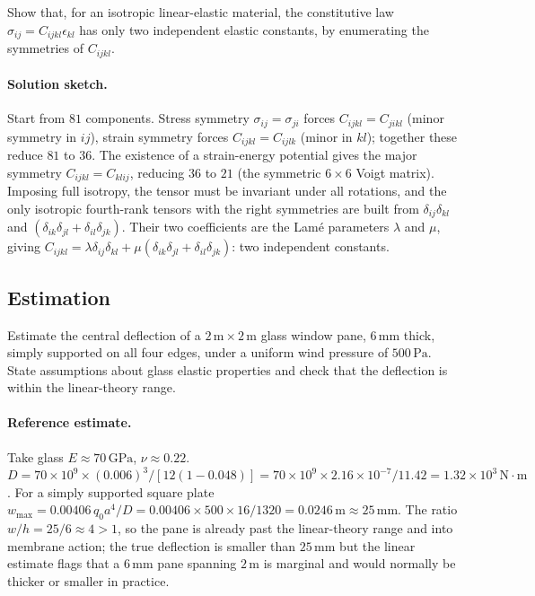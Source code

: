 \begin{exercise}
Show that, for an isotropic linear-elastic material, the
constitutive law $\sigma_{ij} = C_{ijkl} \epsilon_{kl}$ has only
two independent elastic constants, by enumerating the symmetries
of $C_{ijkl}$.

\paragraph{Solution sketch.} Start from $81$ components. Stress
symmetry $\sigma_{ij}=\sigma_{ji}$ forces $C_{ijkl}=C_{jikl}$ (minor
symmetry in $ij$), strain symmetry forces $C_{ijkl}=C_{ijlk}$ (minor
in $kl$); together these reduce $81$ to $36$. The existence of a
strain-energy potential gives the major symmetry $C_{ijkl}=C_{klij}$,
reducing $36$ to $21$ (the symmetric $6\times 6$ Voigt matrix).
Imposing full isotropy, the tensor must be invariant under all
rotations, and the only isotropic fourth-rank tensors with the right
symmetries are built from $\delta_{ij}\delta_{kl}$ and $(\delta_{ik}
\delta_{jl}+\delta_{il}\delta_{jk})$. Their two coefficients are the
Lam{\'e} parameters $\lambda$ and $\mu$, giving $C_{ijkl}=\lambda
\delta_{ij}\delta_{kl}+\mu(\delta_{ik}\delta_{jl}+\delta_{il}
\delta_{jk})$: two independent constants.
\end{exercise}

\subsection*{Estimation}

\begin{exercise}
Estimate the central deflection of a $2 \,\text{m} \times 2\,\text{m}$
glass window pane, $6\,\si{\milli\meter}$ thick, simply supported
on all four edges, under a uniform wind pressure of $500\,\text{Pa}$.
State assumptions about glass elastic properties and check that
the deflection is within the linear-theory range.

\paragraph{Reference estimate.} Take glass $E \approx 70\,\text{GPa}$,
$\nu \approx 0.22$. $D = 70\times 10^9\times (0.006)^3/[12(1-0.048)] =
70\times 10^9\times 2.16\times 10^{-7}/11.42 = 1.32\times 10^3\,
\text{N}\cdot\text{m}$. For a simply supported square plate $w_{\max}
= 0.00406\,q_0 a^4/D = 0.00406\times 500\times 16/1320 = 0.0246\,
\text{m} \approx 25\,\si{\milli\meter}$. The ratio $w/h = 25/6 \approx
4 > 1$, so the pane is already past the linear-theory range and into
membrane action; the true deflection is smaller than $25\,\si{\milli
\meter}$ but the linear estimate flags that a $6\,\si{\milli\meter}$
pane spanning $2\,\si{\meter}$ is marginal and would normally be
thicker or smaller in practice.
\end{exercise}

